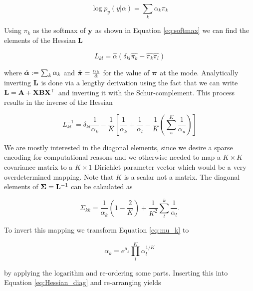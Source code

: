 \begin{equation}
\log p_y(y|\alpha) = \sum_k \alpha_k \pi_k 
\end{equation}

Using $\pi_k$ as the softmax of $\mathbf{y}$ as shown in Equation \ref{eq:softmax} we can find the elements of the Hessian ${\mathbf{L}}$

\begin{equation}
L_{kl} = \hat{\alpha}(\delta_{kl}\hat{\pi_k} - \hat{\pi_k} \hat{\pi_l})
\end{equation}

where $\hat{{\boldsymbol{\alpha}}} := \sum_k \alpha_k$ and $\hat{\boldsymbol{\pi}} = \frac{\alpha_k}{\hat{\alpha}}$ for the value
of $\boldsymbol{\pi}$ at the mode. Analytically inverting ${\mathbf{L}}$ is done via a lengthy derivation using the fact that we can write ${\mathbf{L}} = {\mathbf{A}} + {\mathbf{X}}{\mathbf{B}}{\mathbf{X}}^\top$ and inverting it with the Schur-complement. This process results in the inverse of the Hessian


\begin{equation}
L_{kl}^{-1} = \delta_{kl} \frac{1}{\alpha_k} - \frac{1}{K} \left[\frac{1}{\alpha_k} + \frac{1}{\alpha_l} - \frac{1}{K}\left(\sum_u^K \frac{1}{\alpha_u}\right) \right]
\end{equation}

We are mostly interested in the diagonal elements, since we desire a sparse encoding for computational reasons and we otherwise needed to map a $K \times K$ covariance matrix to a $K\times 1$ Dirichlet parameter vector which would be a very overdetermined mapping. Note that $K$ is a scalar not a matrix. The diagonal elements of ${\boldsymbol{\Sigma}} = {\mathbf{L}}^{-1}$ can be calculated as

\begin{equation}
\label{eq:Hessian_diag}
\Sigma_{kk} = \frac{1}{\alpha_k} \left(1 - \frac{2}{K}\right)  + \frac{1}{K^2} \sum_{l}^{k} \frac{1}{\alpha_l}.
\end{equation}

To invert this mapping we transform Equation \ref{eq:mu_k} to 

\begin{equation}
\label{eq:reform_mu_k}
\alpha_k = e^{\mu_k} \prod_l^{K} \alpha_l^{1/K}
\end{equation}

by applying the logarithm and re-ordering some parts. Inserting this into Equation \ref{eq:Hessian_diag} and re-arranging yields

